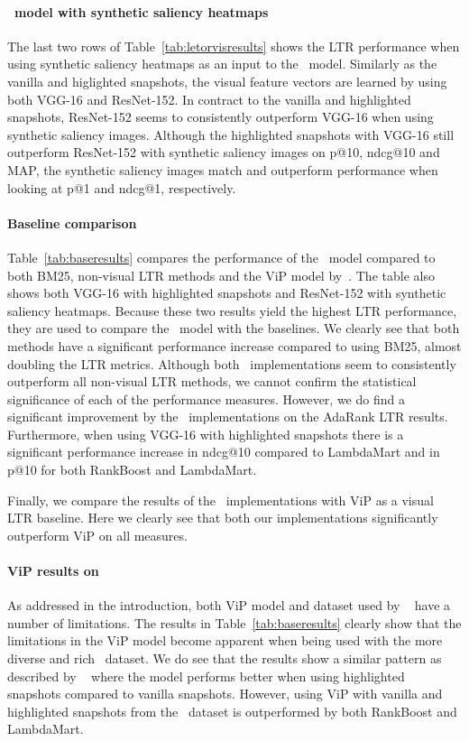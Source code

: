\paragraph{\modelname~model with synthetic saliency heatmaps}
The last two rows of Table~\ref{tab:letorvisresults} shows the \ac{LTR} performance when using synthetic saliency heatmaps as an input to the \modelname~model. Similarly as the vanilla and higlighted snapshots, the visual feature vectors are learned by using both VGG-16 and ResNet-152. In contract to the vanilla and highlighted snapshots, ResNet-152 seems to consistently outperform VGG-16 when using synthetic saliency images. Although the highlighted snapshots with VGG-16 still outperform ResNet-152 with synthetic saliency images on p@10, ndcg@10 and MAP, the synthetic saliency images match and outperform performance when looking at p@1 and ndcg@1, respectively. 

\paragraph{Baseline comparison}
Table~\ref{tab:baseresults} compares the performance of the \modelname~model compared to both BM25, non-visual \ac{LTR} methods and the ViP model by~\citet{fan2017learning}. 
The table also shows both VGG-16 with highlighted snapshots and ResNet-152 with synthetic saliency heatmaps. Because these two results yield the highest \ac{LTR} performance, they are used to compare the \modelname~model with the baselines. 
We clearly see that both methods have a significant performance increase compared to using BM25, almost doubling the \ac{LTR} metrics.
Although both \modelname~implementations seem to consistently outperform all non-visual \ac{LTR} methods, we cannot confirm the statistical significance of each of the performance measures. 
However, we do find a significant improvement by the \modelname~implementations on the AdaRank \ac{LTR} results. Furthermore, when using VGG-16 with highlighted snapshots there is a significant performance increase in ndcg@10 compared to LambdaMart and in p@10 for both RankBoost and LambdaMart.

Finally, we compare the results of the \modelname~implementations with ViP as a visual \ac{LTR} baseline. 
Here we clearly see that both our implementations significantly outperform ViP on all measures. 

\paragraph{ViP results on \datasetname}
As addressed in the introduction, both ViP model and dataset used by ~\citet{fan2017learning} have a number of limitations. The results in Table~\ref{tab:baseresults} clearly show that the limitations in the ViP model become apparent when being used with the more diverse and rich \datasetname~dataset. We do see that the results show a similar pattern as described by ~\citet{fan2017learning} where the model performs better when using highlighted snapshots compared to vanilla snapshots. However, using ViP with vanilla and highlighted snapshots from the \datasetname~dataset is outperformed by both RankBoost and LambdaMart. 

